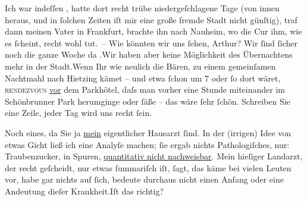 \pstart
           Ich war indeſſen \label{K_L02182-2v}\label{K_L02182-2}, hatte dort recht trübe niedergeſchlagene Tage (von innen heraus,
               und in{ }ſolchen Zeiten iſt mir eine große fremde Stadt nicht günſtig), traf dann
               meinen Vater in Frankfurt, brachte ihn nach Nauheim, wo die Cur ihm, wie es{ }ſcheint, recht wohl tut. – Wie
                  {\pb}könnten wir uns{ }ſehen, Arthur?
               Wir{ }ſind{ }ſicher noch die ganze Woche da \label{K_L02182-3v}\label{K_L02182-3}.\hspace*{1.5em}Wir haben aber keine Möglichkeit des Übernachtens mehr
               in der Stadt.\hspace*{1.5em}Wenn Ihr wie neulich die Bären, zu einem gemeinſamen Nachtmahl
               nach Hietzing kämet – und etwa{ }ſchon um
                  7 oder{ }ſo dort wäret, \textsc{rendezvous}{ }\uline{vor} dem Parkhôtel, daſs man {\pb}vorher
               eine Stunde miteinander im Schönbrunner Park
               herumginge oder{ }ſäße – das wäre{ }ſehr{ }ſchön. Schreiben Sie eine Zeile, jeder Tag wird
               uns recht{ }ſein.\pend
           
\pstart
           Noch eines, da Sie ja \uline{mein} eigentlicher Hausarzt{ }ſind. In der (irrigen) Idee von etwas Gicht ließ ich eine Analyſe machen;{ }ſie ergab
               nichts Pathologiſches, nur: Traubenzucker,  in
               Spuren, {\pb}\uline{quantitativ nicht nachweisbar}. Mein hieſiger Landarzt, der recht
               geſcheidt, nur etwas{ }ſummariſch iſt,{ }ſagt, das käme bei vielen Leuten vor, habe gar
               nichts auf{ }ſich, bedeute durchaus nicht einen Anfang oder eine Andeutung dieſer
                  Krankheit.\hspace*{1.5em}Iſt das richtig?\pend
           
